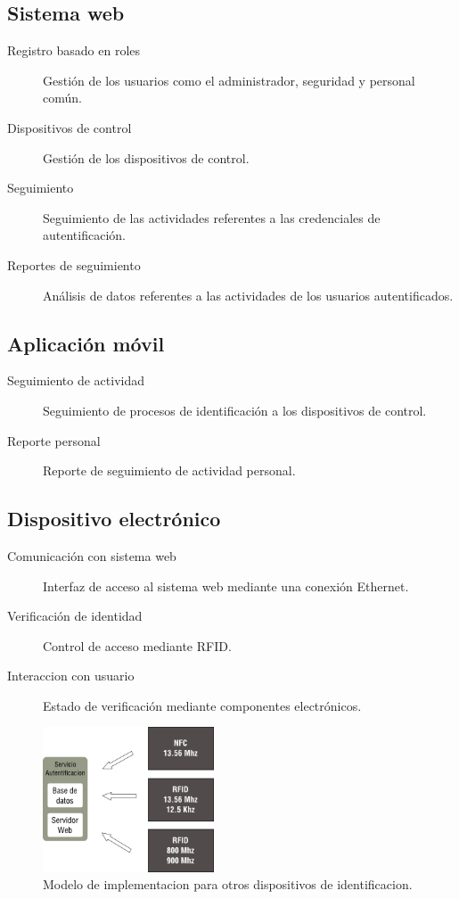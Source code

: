 \documentclass[11pt,twocolumn]{article}
\begin{document}
	\subsection{ Sistema web }
	
	\begin{description}
		\item [Registro basado en roles] Gesti\'on de los usuarios como el administrador, seguridad y personal com\'un.
		\item [Dispositivos de control] Gesti\'on de los dispositivos de control.
		\item [Seguimiento] Seguimiento de las actividades referentes a las credenciales de autentificaci\'on.
		\item [Reportes de seguimiento] An\'alisis de datos referentes a las actividades de los usuarios autentificados.
	\end{description}
	
	\subsection{Aplicaci\'on m\'ovil}		
	
	 \begin{description}
		 \item[Seguimiento de actividad] Seguimiento de procesos de identificaci\'on a los dispositivos de control.
		 \item[Reporte personal] Reporte de seguimiento de actividad personal.
	 \end{description}
	
	\subsection{Dispositivo electr\'onico}
	
	 \begin{description}
		 \item[Comunicaci\'on con sistema web] Interfaz de acceso al sistema web mediante una conexi\'on Ethernet.
		 \item[Verificaci\'on de identidad] Control de acceso mediante RFID.
		 \item[Interaccion con usuario] Estado de verificaci\'on mediante componentes electr\'onicos. 		
	 \end{description}			

\begin{figure}[!h]
  \begin{center}
    \includegraphics[width=2in]{architect.png}
  \end{center}

  \caption{\small Modelo de implementacion para otros dispositivos de identificacion.}
  \label{fig-label}
\end{figure}
\end{document}
